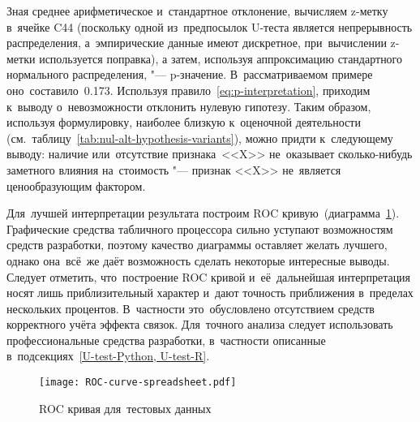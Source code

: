 \documentclass[]{scrreprt}
\begin{document}
Зная среднее арифметическое и~стандартное отклонение, вычисляем z-метку в~ячейке C44 (поскольку одной из~предпосылок U-теста является непрерывность распределения, а~эмпирические данные имеют дискретное, при~вычислении z-метки используется поправка), а затем, используя аппроксимацию стандартного нормального распределения, "--- p-значение. В~рассматриваемом примере оно~составило~0.173. Используя правило~\ref{eq:p-interpretation}, приходим к~выводу о~невозможности отклонить нулевую гипотезу. Таким образом, используя формулировку, наиболее близкую к~оценочной деятельности (см.~таблицу~\ref{tab:nul-alt-hypothesis-variants}), можно придти к~следующему выводу: наличие или~отсутствие признака~<<X>> не~оказывает сколько-нибудь заметного влияния на~стоимость "--- признак <<X>> не~является ценообразующим фактором.

Для~лучшей интерпретации результата построим ROC кривую~(диаграмма~\ref{fig:ROC-curve-spreadsheet}). Графические средства табличного процессора сильно уступают возможностям средств разработки, поэтому качество диаграммы оставляет желать лучшего, однако она~всё~же даёт возможность сделать некоторые интересные выводы. Следует отметить, что~построение ROC кривой и~её~дальнейшая интерпретация носят лишь приблизительный характер и~дают точность приближения в~пределах нескольких процентов. В~частности это~обусловлено отсутствием средств корректного учёта эффекта связок. Для~точного анализа следует использовать профессиональные средства разработки, в~частности описанные в~подсекциях~\cref{U-test-Python, U-test-R}.
%
\begin{figure}[ht]
	\centering
	\texttt{[image: ROC-curve-spreadsheet.pdf]}
	\caption{ROC кривая для~тестовых данных}
	\label{fig:ROC-curve-spreadsheet}
\end{figure}
% 
\end{document}
